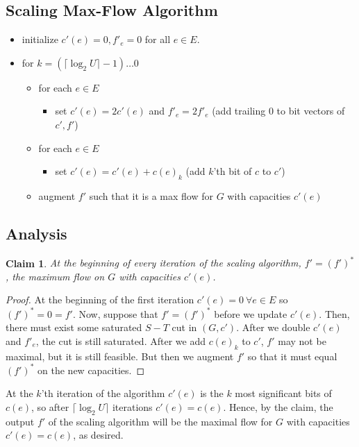 \documentclass[11pt]{article}
\newtheorem{claim}[theorem]{Claim}
\begin{document}
\subsection{Scaling Max-Flow Algorithm}
\begin{itemize}
\item initialize  $c'(e) = 0, f'_e = 0$ for all $e \in E$. 
\item for $k = (\lceil \log_2 U \rceil - 1) \ldots 0$
	 \begin{itemize}
 		\item for each $e \in E$ 
			\begin{itemize}
				\item set $c'(e) = 2c'(e)$ and $f'_e = 2f'_e$ (add trailing 0 to bit vectors of $c', f'$)
			\end{itemize} 
		\item for each $e \in E$ 
			\begin{itemize}
				\item set $c'(e) = c'(e) + c(e)_k$  (add $k$'th bit of $c$ to $c'$)
			\end{itemize} 
		\item augment $f'$ such that it is a max flow for $G$ with capacities $c'(e)$ 
 	\end{itemize}
\end{itemize}

\subsection{Analysis}
\begin{claim}
At the beginning of every iteration of the scaling algorithm, $f' = (f')^*$, the maximum flow on $G$ with capacities $c'(e)$. 
\end{claim}
\begin{proof}
At the beginning of the first iteration $c'(e) = 0  ~ \forall e \in E$ so $(f')^* = 0 = f'$. Now, suppose that $f' = (f')^*$ before we update $c'(e)$. Then, there must exist some saturated $S-T$ cut in $(G, c')$. After we double $c'(e)$ and $f'_e$, the cut is still saturated. After we add $c(e)_k$ to $c'$, $f'$ may not be maximal, but it is still feasible. But then we augment $f'$ so that it must equal $(f')^*$ on the new capacities. 
\end{proof}

At the $k$'th iteration of the algorithm $c'(e)$ is the $k$ most significant bits of $c(e)$, so after $\lceil \log_2 U \rceil $ iterations $c'(e) = c(e)$. Hence, by the claim, the output $f'$ of the scaling algorithm will be the maximal flow for $G$ with capacities $c'(e) = c(e)$, as desired. 
\end{document}
